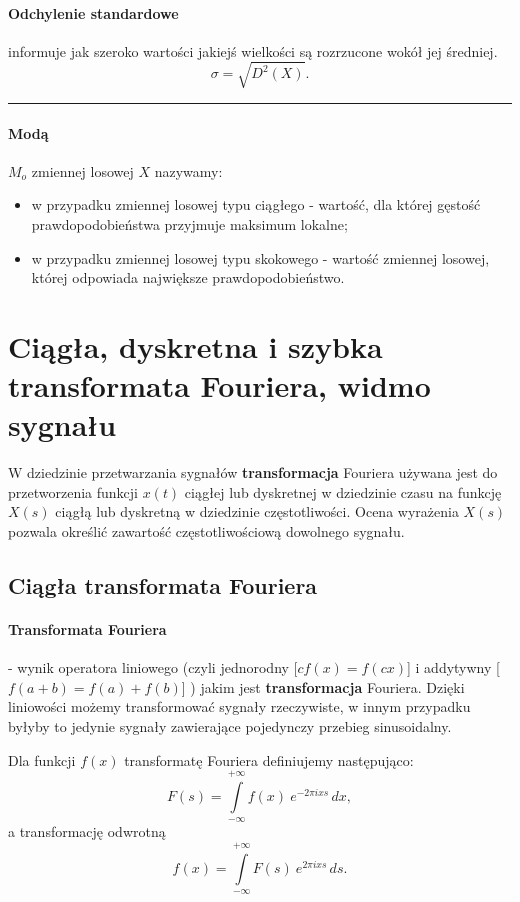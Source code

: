 \documentclass[a4paper,twoside]{report}
\begin{document}
\paragraph{Odchylenie standardowe} informuje jak szeroko wartości jakiejś wielkości są rozrzucone wokół jej średniej. 
\begin{equation}
\sigma = \sqrt{D^2(X)}.
\end{equation}
\rule{\textwidth}{1pt}
\paragraph{Modą} $M_o$ zmiennej losowej $X$ nazywamy:
 \begin{itemize}
 \item w przypadku zmiennej losowej typu ciągłego - wartość, dla której gęstość prawdopodobieństwa przyjmuje maksimum lokalne;
 \item w przypadku zmiennej losowej typu skokowego - wartość zmiennej losowej, której odpowiada największe prawdopodobieństwo.
 \end{itemize}


\section{Ciągła, dyskretna i szybka transformata Fouriera, widmo sygnału}

W dziedzinie przetwarzania sygnałów \textbf{transformacja} Fouriera używana jest do przetworzenia funkcji $x(t)$ ciągłej lub dyskretnej w dziedzinie czasu na funkcję $X(s)$ ciągłą lub dyskretną w dziedzinie częstotliwości. Ocena wyrażenia $X(s)$ pozwala określić zawartość częstotliwościową dowolnego sygnału. 

\subsection{Ciągła transformata Fouriera}
\paragraph{Transformata Fouriera} - wynik operatora liniowego (czyli jednorodny [$ cf(x) = f(cx) $] i addytywny [$f(a+b)=f(a)+f(b)$] ) jakim jest \textbf{transformacja} Fouriera. Dzięki liniowości możemy transformować sygnały rzeczywiste, w innym przypadku byłyby to jedynie sygnały zawierające pojedynczy przebieg sinusoidalny.

Dla funkcji $f(x)$ transformatę Fouriera definiujemy następująco:
\begin{equation}
F(s) = \int\limits_{-\infty}^{+\infty} f(x)\ e^{- 2\pi i x s}\,dx,
\end{equation}
a transformację odwrotną
\begin{equation}
f(x) = \int\limits_{-\infty}^{+\infty} F(s)\ e^{2\pi i x s}\,ds.
\end{equation}
\end{document}
